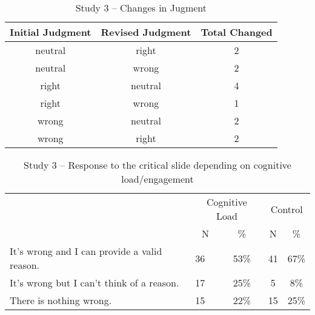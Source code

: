 \documentclass[
  american,
  man,floatsintext]{apa7}
\begin{document}
\begin{table}[tbp]

\begin{center}
\begin{threeparttable}

\caption{\label{tab:tabS3change}Study 3 – Changes in Jugment}

\begin{tabular}{ccc}
\toprule
Initial Judgment & \multicolumn{1}{c}{Revised Judgment} & \multicolumn{1}{c}{Total Changed}\\
\midrule
neutral & right & 2\\
neutral & wrong & 2\\
right & neutral & 4\\
right & wrong & 1\\
wrong & neutral & 2\\
wrong & right & 2\\
\bottomrule
\end{tabular}

\end{threeparttable}
\end{center}

\end{table}

\begin{table}[tbp]

\begin{center}
\begin{threeparttable}

\caption{\label{tab:tabS3tab1dumb1all}Study 3 – Response to the critical slide depending on cognitive load/engagement}

\begin{tabular}{llccc}
\toprule
 & \multicolumn{2}{c}{Cognitive Load} & \multicolumn{2}{c}{Control} \\
\cmidrule(r){2-3} \cmidrule(r){4-5}
 & \multicolumn{1}{c}{N} & \multicolumn{1}{c}{\%} & \multicolumn{1}{c}{N} & \multicolumn{1}{c}{\%}\\
\midrule
It's wrong and I can provide a valid reason. & 36 & 53\% & 41 & 67\%\\
It's wrong but I can't think of a reason. & 17 & 25\% & 5 & 8\%\\
There is nothing wrong. & 15 & 22\% & 15 & 25\%\\
\bottomrule
\end{tabular}

\end{threeparttable}
\end{center}

\end{table}
\end{document}
